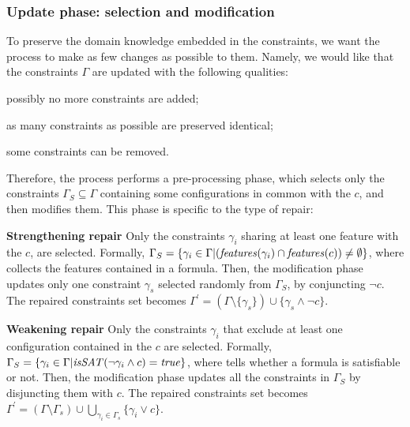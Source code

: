 \begin{tikzborder}{\cite{Gargantini16:validation}}
\begin{tikzborder}{\cite{gargantini_combinatorial_2017}}
\begin{tikzborder}{\cite{gargantini_combinatorial_2017}}
\begin{tikzborder}{\cite{garn2019}}
\begin{tikzborder}{\cite{arcaini2019achieving}}
\begin{tikzborder}{\cite{arcaini2019varivolution}}
		\subsubsection{Update phase: \textsf{selection} and \textsf{modification}}\label{sec:selectionAndMod}
		\bb To preserve the domain knowledge embedded in the constraints, we want the process to make as few changes as possible to them. Namely, we would like that the constraints $\Gamma$ are updated with the following qualities:
		\begin{compactenum}
			\item possibly no more constraints are added;
			\item as many constraints as possible are preserved identical;
			\item some constraints can be removed.
		\end{compactenum} 
		Therefore, the process performs a pre-processing phase, which selects only the constraints $\Gamma_S \subseteq \Gamma$ containing some configurations in common with the \fcc $c$, and then modifies them. This phase is specific to the type of repair:
		\begin{compactitem}
			\item[\textbf{Strengthening repair}] Only the constraints $\gamma_i$ sharing at least one feature with the \fcc $c$, are selected. Formally, $\Gamma_S = \{\gamma_i \in \Gamma | (\mathit{features}(\gamma_i) \cap \mathit{features}(c)) \neq \emptyset\}$, where \features collects the features contained in a formula. Then, the modification phase updates only one constraint $\gamma_s$ selected randomly from $\Gamma_S$, by conjuncting $\neg c$. The repaired constraints set becomes $\Gamma^\prime = (\Gamma \setminus \{\gamma_s\}) \cup \{\gamma_s \wedge \neg c\}$.
			\item[\textbf{Weakening repair}] Only the constraints $\gamma_i$ that exclude at least one configuration contained in the \fcc $c$ are selected. Formally, $\Gamma_S = \{\gamma_i \in \Gamma | \mathit{isSAT}(\neg \gamma_i \wedge c )=\mathit{true}\}$, where \sat tells whether a formula is satisfiable or not. Then, the modification phase updates all the constraints in $\Gamma_S$ by disjuncting them with $c$. The repaired constraints set becomes $\Gamma^\prime = (\Gamma \setminus \Gamma_s) \cup \bigcup_{\gamma_i \in \Gamma_s} \{\gamma_i \vee c\}$.
		\end{compactitem}\be
		

\end{tikzborder}
\end{tikzborder}
\end{tikzborder}
\end{tikzborder}
\end{tikzborder}
\end{tikzborder}
